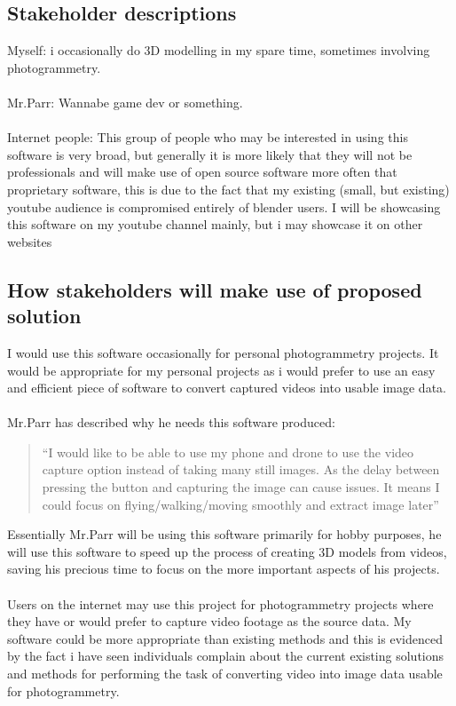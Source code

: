 \documentclass[11pt]{report}
\begin{document}
\subsection{Stakeholder descriptions}
Myself: i occasionally do 3D modelling in my spare time, sometimes involving photogrammetry.\\\\
Mr.Parr: Wannabe game dev or something.\\\\
Internet people: This group of people who may be interested in using this software is very broad, but generally it is more likely that they will not be professionals and will make use of open source software more often that proprietary software, this is due to the fact that my existing (small, but existing) youtube audience is compromised entirely of blender users. I will be showcasing this software on my youtube channel mainly, but i may showcase it on other websites
\subsection{How stakeholders will make use of proposed solution}
I would use this software occasionally for personal photogrammetry projects. It would be appropriate for my personal projects as i would prefer to use an easy and efficient piece of software to convert captured videos into usable image data.\\\\
Mr.Parr has described why he needs this software produced: 
\begin{quote}
``I would like to be able to use my phone and drone to use the video capture option instead of taking many still images. As the delay between pressing the button and capturing the image can cause issues. It means I could focus on flying/walking/moving smoothly and extract image later''
\end{quote}
Essentially Mr.Parr will be using this software primarily for hobby purposes, he will use this software to speed up the process of creating 3D models from videos, saving his precious time to focus on the more important aspects of his projects.\\\\
Users on the internet may use this project for photogrammetry projects where they have or would prefer to capture video footage as the source data. My software could be more appropriate than existing methods and this is evidenced by the fact i have seen individuals complain about the current existing solutions and methods for performing the task of converting video into image data usable for photogrammetry.
\end{document}
